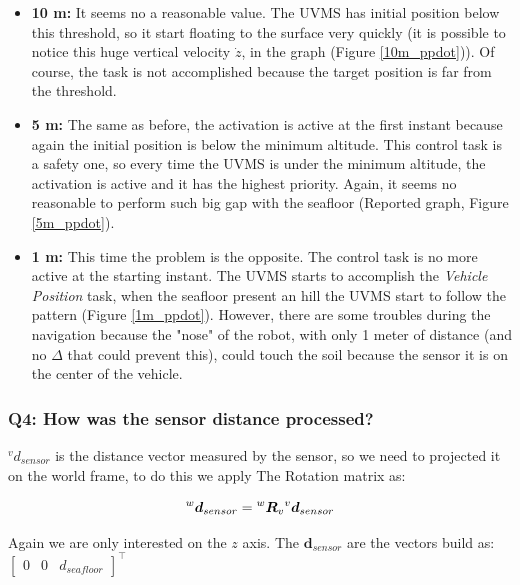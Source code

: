 \documentclass{article}
\begin{document}
\begin{itemize}
    \item \textbf{10 m:} It seems no a reasonable value. The UVMS has initial position below this threshold, so it start floating to the surface very quickly (it is possible to notice this huge vertical velocity $\dot{z}$, in the graph (Figure \ref{10m_ppdot})). Of course, the task is not accomplished because the target position is far from the threshold.
    \item \textbf{5 m:} The same as before, the activation is active at the first instant because again the initial position is below the minimum altitude. This control task is a safety one, so every time the UVMS is under the minimum altitude, the activation is active and it has the highest priority. Again, it seems no reasonable to perform such big gap with the seafloor (Reported graph, Figure \ref{5m_ppdot}).
    \item \textbf{1 m:} This time the problem is the opposite. The control task is no more active at the starting instant. The UVMS starts to accomplish the \textit{Vehicle Position} task, when the seafloor present an hill the UVMS start to follow the pattern (Figure \ref{1m_ppdot}). However, there are some troubles during the navigation because the "nose" of the robot, with only 1 meter of distance (and no $\Delta$ that could prevent this), could touch the soil because the sensor it is on the center of the vehicle.
\end{itemize}

\subsubsection{Q4: How was the sensor distance processed?}
 
 ${^{v}d_{sensor}}$ is the distance vector measured by the sensor, so we need to projected it on the world frame, to do this we apply The Rotation matrix as:
 
 \begin{equation}
 \large
     {^{w}\boldsymbol{d}_{sensor}} = {^{w}\boldsymbol{R}_{v}} {^{v}\boldsymbol{d}_{sensor}}
 \end{equation}
 
 \noindent
 Again we are only interested on the $z$ axis. The $\boldsymbol{d}_{sensor}$ are the vectors build as:
 $\begin{bmatrix}0 & 0 & d_{seafloor} \end{bmatrix}^\top$
\\ 
\end{document}
